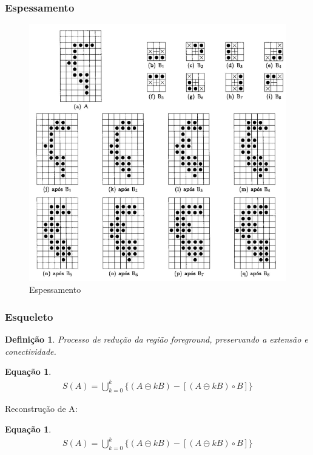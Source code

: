 \documentclass[aspectratio=169]{beamer}
\theoremstyle{Definition}
\newtheorem{defn}{Defini\c c\~ao}
\newtheorem{eq}[theorem]{Equa\c c\~ao}
\begin{document}
\begin{frame}
	\frametitle{Espessamento}
	
	\begin{figure}[h]
	 	\includegraphics[width=0.6\paperwidth,height=0.6\paperheight]{imagens/espessamento}
		\caption{Espessamento}\label{figLogical}
	\end{figure}
	
\end{frame}

\begin{frame}
	\frametitle{Esqueleto}
	
	\begin{defn}
		Processo de redução da região foreground, preservando a extensão e conectividade.
	\end{defn}
	
	\begin{eq}
		\begin{align*}
				S(A) = \bigcup^k_{k=0} \{ (A \circleddash kB) - [(A \circleddash kB) \circ B] \}
		\end{align*}
	\end{eq}
	
	Reconstrução de A:
	
	\begin{eq}
		\begin{align}
				S(A) = \bigcup^k_{k=0} \{ (A \circleddash kB) - [(A \circleddash kB) \circ B] \}
		\end{align}
	\end{eq}
		
\end{frame}
\end{document}
